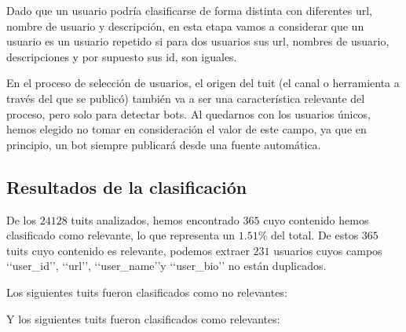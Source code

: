 Dado que un usuario podría clasificarse de forma distinta con diferentes url, nombre de usuario y 
descripción, en esta etapa vamos a considerar que un usuario es un usuario repetido si para dos 
usuarios sus url, nombres de usuario, descripciones y por supuesto sus id, son iguales.

En el proceso de selección de usuarios, el origen del tuit (el canal o herramienta a través del que 
se publicó) también va a ser una característica relevante del proceso, pero solo para detectar bots. 
Al quedarnos con los usuarios únicos, hemos elegido no tomar en consideración el valor de
este campo, ya que en principio, un bot siempre publicará desde una fuente automática.

\subsection{Resultados de la clasificación}
De los $24128$ tuits analizados, hemos encontrado $365$ cuyo contenido hemos clasificado como
relevante, lo que representa un $1.51$\% del total. De estos $365$ tuits
cuyo contenido es relevante, podemos extraer $231$ usuarios cuyos campos
\lq\lq user\_id\rq\rq, \lq\lq url\rq\rq, \lq\lq user\_name\rq\rq y \lq\lq user\_bio\rq\rq
no están duplicados.

Los siguientes tuits fueron clasificados como no relevantes:


Y los siguientes tuits fueron clasificados como relevantes:


